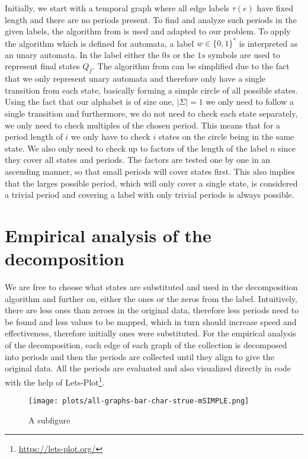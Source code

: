 Initially, we start with a temporal graph where all edge labels $\tau(e)$ have fixed length and there are no periods present. To find and analyze such periods in the given labels, the algorithm from \cite{DBLP:journals/corr/abs-2107-04683} is used and adapted to our problem. To apply the algorithm which is defined for automata, a label $ w \in \{0,1\}^*$ is interpreted as an unary automata. In the label either the $0s$ or the $1s$ symbols are used to represent final states $Q_f$. The algorithm from \cite{DBLP:journals/corr/abs-2107-04683} can be simplified due to the fact that we only represent unary automata and therefore only have a single transition from each state, basically forming a simple circle of all possible states. Using the fact that our alphabet is of size one, $|\Sigma| = 1$ we only need to follow a single transition and furthermore, we do not need to check each state separately, we only need to check multiples of the chosen period. This means that for a period length of $i$ we only have to check $i$ states on the circle being in the same state. We also only need to check up to factors of the length of the label $n$ since they cover all states and periods. The factors are tested one by one in an ascending manner, so that small periods will cover states first. This also implies that the larges possible period, which will only cover a single state, is considered a trivial period and covering a label with only trivial periods is always possible.

\section{Empirical analysis of the decomposition}

We are free to choose what states are substituted and used in the decomposition algorithm and further on, either the ones or the zeros from the label. Intuitively, there are less ones than zeroes in the original data, therefore less periods need to be found and less values to be mapped, which in turn should increase speed and effectiveness, therefore initially ones were substituted. For the empirical analysis of the decomposition, each edge of each graph of the collection is decomposed into periods and then the periods are collected until they align to give the original data. All the periods are evaluated and also visualized directly in code with the help of Lets-Plot\footnote{\url{https://lets-plot.org/}}.

\begin{figure}[h]
	\texttt{[image: plots/all-graphs-bar-char-strue-mSIMPLE.png]}
	\caption{A subfigure}
	\label{fig:plot-all-periods-true-state}
\end{figure}

